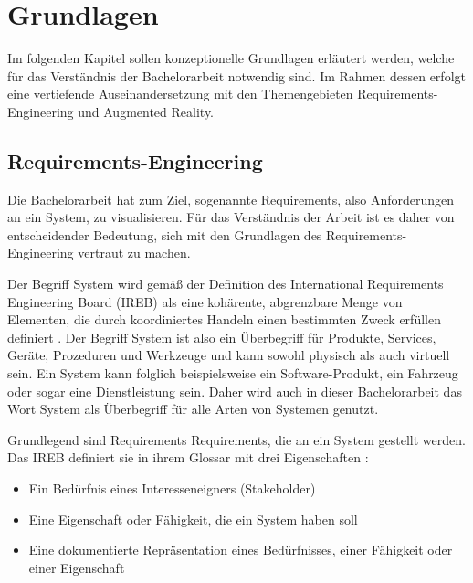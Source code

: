 \chapter{Grundlagen} %

Im folgenden Kapitel sollen konzeptionelle Grundlagen erläutert werden, welche für das Verständnis der Bachelorarbeit notwendig sind.
Im Rahmen dessen erfolgt eine vertiefende Auseinandersetzung mit den Themengebieten Requirements-Engineering und Augmented Reality.

  \section{Requirements-Engineering}
  Die Bachelorarbeit hat zum Ziel, sogenannte Requirements, also Anforderungen an ein System, zu visualisieren.
  Für das Verständnis der Arbeit ist es daher von entscheidender Bedeutung, sich mit den Grundlagen des Requirements-Engineering vertraut zu machen.


    Der Begriff \glqq{}System\grqq{} wird gemäß der Definition des International Requirements Engineering Board (IREB) als \glqq{}eine kohärente, abgrenzbare Menge von Elementen, die durch koordiniertes Handeln einen bestimmten Zweck erfüllen\grqq{} definiert \autocite[][]{ireb_cpre_glossary}. 
    Der Begriff \glqq{}System\grqq{} ist also ein Überbegriff für Produkte, Services, Geräte, Prozeduren und Werkzeuge und kann sowohl physisch als auch virtuell sein.
    Ein System kann folglich beispielsweise ein Software-Produkt, ein Fahrzeug oder sogar eine Dienstleistung sein.
    Daher wird auch in dieser Bachelorarbeit das Wort \glqq{}System\grqq{} als Überbegriff für alle Arten von Systemen genutzt.


    Grundlegend sind Requirements Requirements, die an ein System gestellt werden.
    Das IREB definiert sie in ihrem Glossar mit drei Eigenschaften \autocite[][Def. Requirement]{ireb_cpre_glossary}:
    \begin{itemize}
        \item Ein Bedürfnis eines Interesseneigners (Stakeholder)
        \item Eine Eigenschaft oder Fähigkeit, die ein System haben soll
        \item Eine dokumentierte Repräsentation eines Bedürfnisses, einer Fähigkeit oder einer Eigenschaft
    \end{itemize}
  
